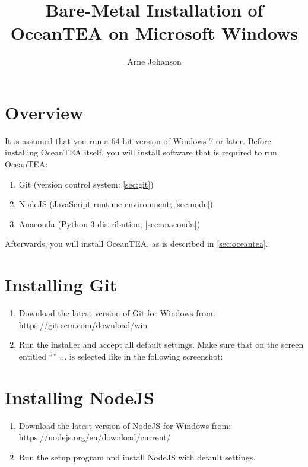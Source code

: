 \documentclass[11pt,a4paper,english,oneside,parskip=false]{scrartcl} %
\begin{document}
\title{Bare\hyp{}Metal Installation of OceanTEA on Microsoft Windows}
\author{Arne Johanson}
\date{}

\maketitle

\section{Overview}

It is assumed that you run a 64 bit version of Windows 7 or later. 
Before installing OceanTEA itself, you will install software that is required to run OceanTEA: 
\begin{enumerate}
	\item Git (version control system; \autoref{sec:git})
	\item NodeJS (JavaScript runtime environment; \autoref{sec:node})
	\item Anaconda (Python 3 distribution; \autoref{sec:anaconda})
\end{enumerate}
Afterwards, you will install OceanTEA, as is described in \autoref{sec:oceantea}. 


\section{Installing Git} \label{sec:git}

\begin{enumerate}
	\item Download the latest version of Git for Windows from:\\ \url{https://git-scm.com/download/win}
	\item Run the installer and accept all default settings. Make sure that on the screen entitled \enquote{} ... is selected like in the following screenshot:
\end{enumerate}



\section{Installing NodeJS} \label{sec:node}

\begin{enumerate}
	\item Download the latest version of NodeJS for Windows from:\\
	\url{https://nodejs.org/en/download/current/}
	\item Run the setup program and install NodeJS with default settings.
\end{enumerate}
\end{document}
